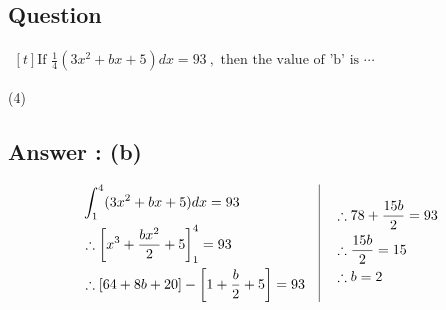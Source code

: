 \documentclass[17pt]{extarticle}
\begin{document}
\begin{fleqn}
\section{Question} 

$\begin{aligned}[t] 
\text{If \ } \frac{1}{4} (3x^2 + bx + 5) dx = 93\ , \text{ then the value of 'b' is } \cdots
\end{aligned}$

\begin{tasks}(4)
  \task {}
\end{tasks}
\subsection*{Answer : (b)}
\begin{equation} \nonumber
\begin{alignedat}{4}
& \int_{1}^{4} (3x^2 + bx + 5) dx = 93\\
& \therefore \left[ x^3 +\frac{bx^2}{2}+5\right]_{1}^{4} = 93\\
& \therefore [64+8b+20] - \left[ 1 + \frac{b}{2} + 5\right]=93\\
\end{alignedat}
\quad
\vrule
\quad
\begin{alignedat}{4}
& \therefore 78+\frac{15b}{2} = 93\\
& \therefore \frac{15b}{2} = 15\\
& \therefore b=2\\
\end{alignedat}
\end{equation}


\end{fleqn}
\end{document}
